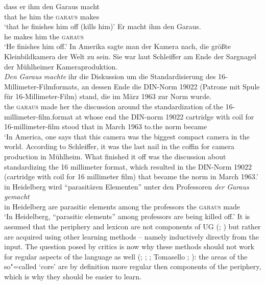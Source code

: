 \addlines
\eal
\ex 
\gll dass er ihm den Garaus macht\\
	 that he him the \textsc{garaus} makes\\
\glt `that he finishes him off (kills him)'
\ex 
\gll Er macht ihm den Garaus.\\
	 he makes him the \textsc{garaus}\\
\glt `He finishes him off.'
\ex
In Amerika sagte man der Kamera nach, die größte Kleinbildkamera der Welt zu sein. Sie war laut
Schleiffer am Ende der Sargnagel der Mühlheimer Kameraproduktion.\\
\gll 
\emph{Den} \emph{Garaus} \emph{machte} ihr die Diskussion um die Standardisierung des 16-Millimeter-Filmformats,
an dessen Ende die DIN-Norm 19022 (Patrone mit Spule für 16-Millimeter-Film) stand, die im März 1963
zur Norm wurde.\footnotemark\\
the \textsc{garaus} made her
the discussion around the standardization of.the 16-millimeter-film.format at whose end the DIN-norm 19022
\spacebr{}cartridge with coil for 16-millimeter-film stood that in March 1963 to.the norm
became\\
\glt `In America, one says that this camera was the biggest compact camera in the world. According to Schleiffer, it was the
last nail in the coffin for camera production in Mühlheim. What finished it off was the discussion about standardizing
the 16 millimeter format, which resulted in the DIN-Norm 19022 (cartridge with coil for 16 millimeter film) that became
the norm in March 1963.'
\ex
\gll in Heidelberg wird "`parasitären Elementen"' unter den Professoren \emph{der} \emph{Garaus} \emph{gemacht}\footnotemark\\
	 in Heidelberg are parasitic elements among the professors the \textsc{garaus} made\\
\glt `In Heidelberg, ``parasitic elements'' among professors are being killed off.'
\zl
\noindent
It is assumed that the periphery and lexicon are not components of UG (\citealp[--151]{Chomsky86a}; \citealp[]{Fodor98a})
but rather are acquired using other learning methods -- namely inductively directly from the input. The question posed by critics is now why these methods should not work for regular aspects of the language as well (\citealp[]{Abney96a}; 
\citealp[]{Goldberg2003b}; \citealp[]{Newmeyer2005a}; Tomasello \citeyear[]{Tomasello2006a}; \citeyear[]{Tomasello2006c}): the areas of the so"=called `core' are by definition more regular then components of the periphery, which is why
they should be easier to learn.

